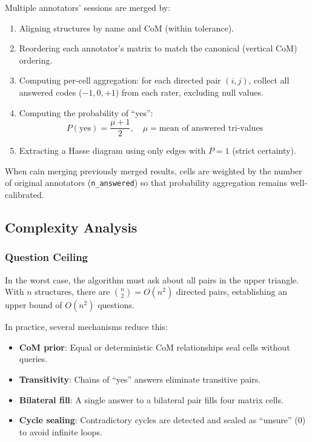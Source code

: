 \documentclass[12pt,a4paper]{article}
\begin{document}
Multiple annotators' sessions are merged by:

\begin{enumerate}
  \item Aligning structures by name and CoM (within tolerance).
  \item Reordering each annotator's matrix to match the canonical (vertical CoM) ordering.
  \item Computing per-cell aggregation: for each directed pair $(i, j)$, collect all answered codes ($-1, 0, +1$) from each rater, excluding null values.
  \item Computing the probability of ``yes'':
  \[
  P(\text{yes}) = \frac{\mu + 1}{2}, \quad \mu = \text{mean of answered tri-values}
  \]
  \item Extracting a Hasse diagram using only edges with $P = 1$ (strict certainty).
\end{enumerate}

When cain merging previously merged results, cells are weighted by the number of original annotators (\texttt{n\_answered}) so that probability aggregation remains well-calibrated.

\subsection{Complexity Analysis}

\subsubsection{Question Ceiling}

In the worst case, the algorithm must ask about all pairs in the upper triangle. With $n$ structures, there are $\binom{n}{2} = O(n^2)$ directed pairs, establishing an upper bound of $O(n^2)$ questions.

In practice, several mechanisms reduce this:
\begin{itemize}
  \item \textbf{CoM prior}: Equal or deterministic CoM relationships seal cells without queries.
  \item \textbf{Transitivity}: Chains of ``yes'' answers eliminate transitive pairs.
  \item \textbf{Bilateral fill}: A single answer to a bilateral pair fills four matrix cells.
  \item \textbf{Cycle sealing}: Contradictory cycles are detected and sealed as ``unsure'' ($0$) to avoid infinite loops.
\end{itemize}
\end{document}
